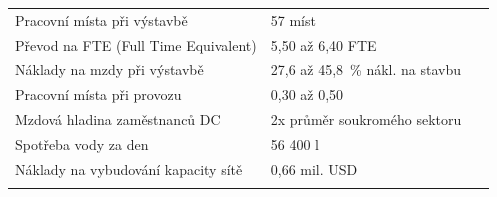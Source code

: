 \begin{landscape}
\begin{table}[p]
\begin{tabular}{llc}
        Pracovní místa při výstavbě & 57 míst &~\cite{to_albertas_2025} \\
        \quad Převod na FTE (Full Time Equivalent) & 5,50 až 6,40 FTE &~\cite{johnson_economics_economic_2025, lee_breaking_2025} \\
        \quad Náklady na mzdy při výstavbě & 27,6 až 45,8~\% nákl. na stavbu &~\cite{to_albertas_2025,diao_economic_2025} \\
        Pracovní místa při provozu & 0,30 až 0,50 &~\cite{to_albertas_2025,diao_economic_2025,lee_breaking_2025} \\
        Mzdová hladina zaměstnanců DC & 2x průměr soukromého sektoru &~\cite{kshetri_data_2024} \\

        \addlinespace
        \midrule
        \addlinespace

        Spotřeba vody za den & 56 400 l &~\cite{pilz_compute_2023, de_roucy-rochegonde_ai_2025, sheng_power_2026, international_energy_agency_iea_energy_2025} \\
        Náklady na vybudování kapacity sítě & 0,66 mil. USD &~\cite{diao_economic_2025,davenport_ai_2024} \\

        \addlinespace
        \bottomrule
    \end{tabular}

\end{table} \end{landscape}


